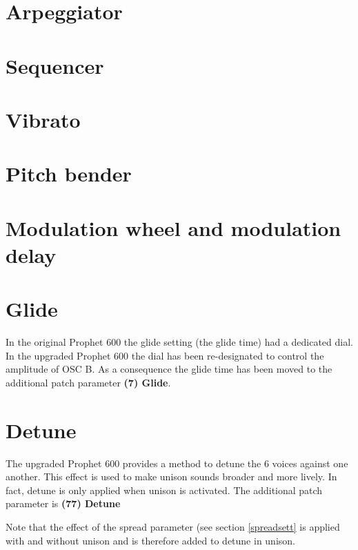 \documentclass[landscape, 11pt, oneside]{report}
\newenvironment{flowtext}{\addmargin[0cm]{7cm}}{\endaddmargin} %
\begin{document}
\begin{flowtext}
\section{Arpeggiator}\label{arp}



\section{Sequencer}\label{seq}



\section{Vibrato}\label{vib}



\section{Pitch bender}\label{pitchbend}



\section{Modulation wheel and modulation delay}\label{modwheel}



\section{Glide}\label{glide}

In the original Prophet 600 the glide setting (the glide time) had a dedicated dial. In the upgraded Prophet 600 the dial has been re-designated to control the amplitude of OSC B. As a consequence the glide time has been moved to the additional patch parameter \textbf{(7) Glide}. 

\section{Detune}\label{detune}

The upgraded Prophet 600 provides a method to detune the 6 voices against one another. This effect is used to make unison sounds broader and more lively. In fact, detune is only applied when unison is activated. The additional patch parameter is \textbf{(77) Detune}

Note that the effect of the spread parameter (see section \ref{spreadsett} is applied with and without unison and is therefore added to detune in unison. 


\end{flowtext}
\end{document}
